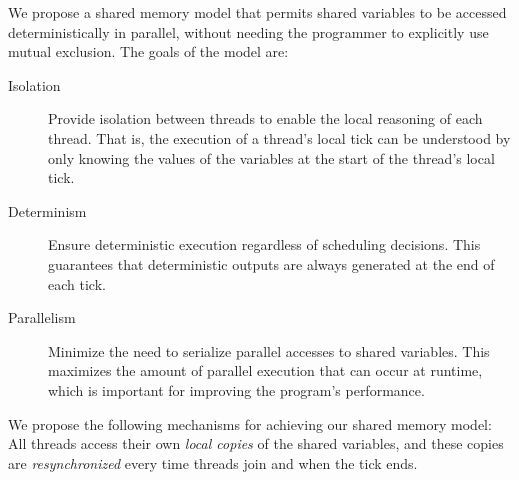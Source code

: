 We propose a shared memory model that permits shared 
variables to be accessed deterministically in parallel, without 
needing the programmer to explicitly use mutual exclusion. 
The goals of the model are: 
\begin{description}
	\item[Isolation] Provide isolation between threads to enable the local reasoning of each thread.
		  That is, the execution of a thread's local tick can be understood by only knowing 
		  the values of the variables at the start of the thread's local tick.

	\item[Determinism~\cite{Maraninchi92}] Ensure deterministic execution regardless of scheduling decisions. This guarantees 
		  that deterministic outputs are always generated at the end of each tick.

	\item[Parallelism] Minimize the need to serialize parallel accesses to shared variables. This
		  maximizes the amount of parallel execution that can occur at runtime, which is important 
		  for improving the program's performance.
\end{description}
We propose the following mechanisms for achieving our shared memory model: 
All threads access their own \emph{local copies} of the shared variables, and these 
copies are \emph{resynchronized} every time threads join and when the tick ends.

